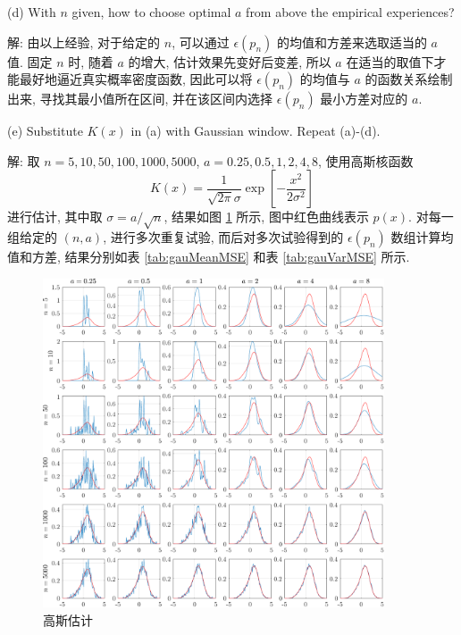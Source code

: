 \documentclass[openany]{ctexbook}
\theoremstyle{kaiti}
\theoremstyle{normal}
\begin{document}
(d) With $n$ given, how to choose optimal $a$ from above the empirical experiences?

解: 由以上经验, 对于给定的 $n$, 可以通过 $\epsilon(p_n)$ 的均值和方差来选取适当的 $a$ 值. 固定 $n$ 时, 随着 $a$ 的增大, 估计效果先变好后变差, 所以 $a$ 在适当的取值下才能最好地逼近真实概率密度函数, 因此可以将 $\epsilon(p_n)$ 的均值与 $a$ 的函数关系绘制出来, 寻找其最小值所在区间, 并在该区间内选择 $\epsilon(p_n)$ 最小方差对应的 $a$.

(e) Substitute $K(x)$ in (a) with Gaussian window. Repeat (a)-(d).

解: 取 $n=5,10,50,100,1000,5000$, $a=0.25,0.5,1,2,4,8$, 使用高斯核函数
\begin{equation}
  K(x)=\frac{1}{\sqrt{2\pi}\sigma}\exp\left[-\frac{x^2}{2\sigma^2}\right]
\end{equation}
进行估计, 其中取 $\sigma=a/\sqrt{n}$, 结果如图 \ref{fig:gauwin} 所示, 图中红色曲线表示 $p(x)$. 对每一组给定的 $(n,a)$, 进行多次重复试验, 而后对多次试验得到的 $\epsilon(p_n)$ 数组计算均值和方差, 结果分别如表 \ref{tab:gauMeanMSE} 和表 \ref{tab:gauVarMSE} 所示.

\begin{figure}[htbp]
  \centering
  \includegraphics[width=0.9\textwidth]{gaussianWindow.pdf}
  \caption{高斯估计}
  \label{fig:gauwin}
\end{figure}
\end{document}
